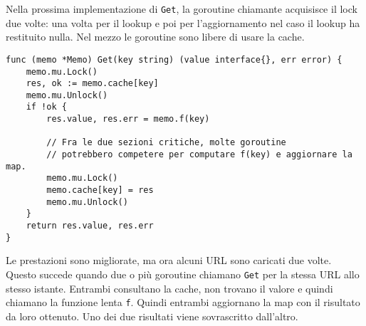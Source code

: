 \documentclass[../../thesis.tex]{subfiles}
\begin{document}
    Nella prossima implementazione di \verb"Get", la goroutine chiamante acquisisce il lock due volte: una volta per il lookup e poi per l'aggiornamento nel caso il lookup ha restituito nulla.
    Nel mezzo le goroutine sono libere di usare la cache.
    \begin{lstlisting}[frame = single, label = {lst:lstlisting9-7.7}]
func (memo *Memo) Get(key string) (value interface{}, err error) {
    memo.mu.Lock()
    res, ok := memo.cache[key]
    memo.mu.Unlock()
    if !ok {
        res.value, res.err = memo.f(key)
        
        // Fra le due sezioni critiche, molte goroutine
        // potrebbero competere per computare f(key) e aggiornare la map.
        memo.mu.Lock()
        memo.cache[key] = res
        memo.mu.Unlock()
    }
    return res.value, res.err
}
    \end{lstlisting}
    Le prestazioni sono migliorate, ma ora alcuni URL sono caricati due volte.
    Questo succede quando due o più goroutine chiamano \verb"Get" per la stessa URL allo stesso istante.
    Entrambi consultano la cache, non trovano il valore e quindi chiamano la funzione lenta \verb"f".
    Quindi entrambi aggiornano la map con il risultato da loro ottenuto.
    Uno dei due risultati viene sovrascritto dall'altro.
    \hfill \vspace{12pt}
\end{document}
